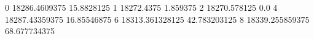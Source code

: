 0 18286.4609375 15.8828125
1 18272.4375 1.859375
2 18270.578125 0.0
4 18287.43359375 16.85546875
6 18313.361328125 42.783203125
8 18339.255859375 68.677734375
